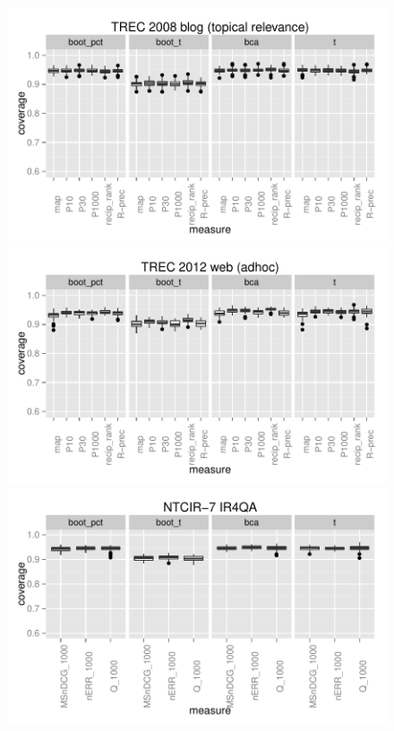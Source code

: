 \documentclass{sig-alt-release-2013}
\begin{document}
\begin{figure}
\includegraphics[width=\linewidth]{trec17-blog}
\includegraphics[width=\linewidth]{trec21-web}
\includegraphics[width=\linewidth]{ntcir7-ir4qa}

\end{figure}
\end{document}
